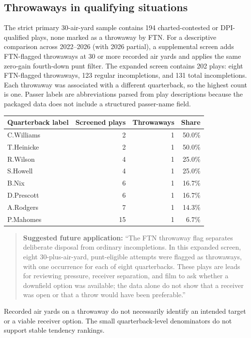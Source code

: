 \documentclass[11pt]{article}
\begin{document}
\subsection{Throwaways in qualifying situations}

The strict primary 30-air-yard sample contains 194 charted-contested or DPI-qualified plays, none marked as a throwaway by FTN. For a descriptive comparison across 2022--2026 (with 2026 partial), a supplemental screen adds FTN-flagged throwaways at 30 or more recorded air yards and applies the same zero-gain fourth-down punt filter. The expanded screen contains 202 plays: eight FTN-flagged throwaways, 123 regular incompletions, and 131 total incompletions. Each throwaway was associated with a different quarterback, so the highest count is one. Passer labels are abbreviations parsed from play descriptions because the packaged data does not include a structured passer-name field.

\begin{center}
\begin{tabular}{lrrr}
\toprule
Quarterback label & Screened plays & Throwaways & Share \\
\midrule
C.Williams & 2 & 1 & 50.0\% \\
T.Heinicke & 2 & 1 & 50.0\% \\
R.Wilson & 4 & 1 & 25.0\% \\
S.Howell & 4 & 1 & 25.0\% \\
B.Nix & 6 & 1 & 16.7\% \\
D.Prescott & 6 & 1 & 16.7\% \\
A.Rodgers & 7 & 1 & 14.3\% \\
P.Mahomes & 15 & 1 & 6.7\% \\
\bottomrule
\end{tabular}
\end{center}

\begin{quote}
\textbf{Suggested future application:} ``The FTN throwaway flag separates deliberate disposal from ordinary incompletions. In this expanded screen, eight 30-plus-air-yard, punt-eligible attempts were flagged as throwaways, with one occurrence for each of eight quarterbacks. These plays are leads for reviewing pressure, receiver separation, and film to ask whether a downfield option was available; the data alone do not show that a receiver was open or that a throw would have been preferable.''
\end{quote}

Recorded air yards on a throwaway do not necessarily identify an intended target or a viable receiver option. The small quarterback-level denominators do not support stable tendency rankings.
\end{document}
